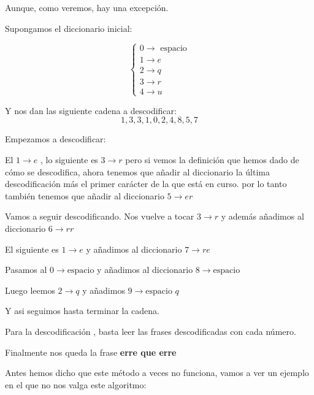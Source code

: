 Aunque, como veremos, hay una excepción.

\begin{example}
	Supongamos el diccionario inicial:
	
	$$\begin{cases}
	0 \rightarrow \text{ espacio}\\
	1 \rightarrow e\\
	2 \rightarrow q\\
	3 \rightarrow r\\
	4 \rightarrow u
	\end{cases}$$
	
	Y nos dan las siguiente cadena a descodificar:
	$$1,3,3,1,0,2,4,8,5,7$$
	
	Empezamos a descodificar:
	
	El $1 \rightarrow e$ , lo siguiente es $3 \rightarrow r$ pero si vemos la definición que hemos dado de cómo se descodifica, ahora tenemos que añadir al diccionario la última descodificación más el primer carácter de la que está en curso. por lo tanto también tenemos que añadir al diccionario $5\rightarrow er$
	
	Vamos a seguir descodificando. Nos vuelve a tocar $3 \rightarrow r$ y además añadimos al diccionario $6 \rightarrow rr$
	
	El siguiente es $1 \rightarrow e$ y añadimos al diccionario $7 \rightarrow re$
	
	Pasamos al $0 \rightarrow \text{espacio}$ y añadimos al diccionario $8 \rightarrow \text{espacio}$
	
	Luego leemos $2 \rightarrow q$ y añadimos $9 \rightarrow \text{espacio } q$
	
	Y asi seguimos hasta terminar la cadena.
	
	Para la descodificación , basta leer las frases descodificadas con cada número.
	
	Finalmente nos queda la frase \textbf{erre que erre}
\end{example}

Antes hemos dicho que este método a veces no funciona, vamos a ver un ejemplo en el que no nos valga este algoritmo:

